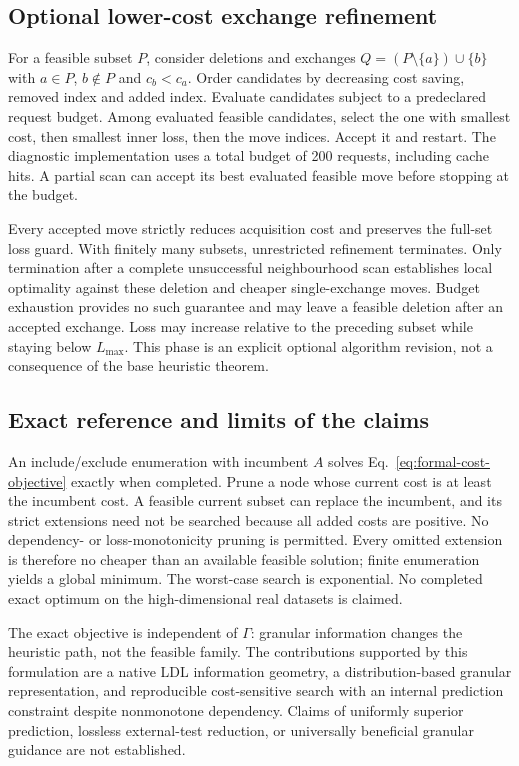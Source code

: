\subsection{Optional lower-cost exchange refinement}
For a feasible subset $P$, consider deletions and exchanges $Q=(P\setminus\{a\})\cup\{b\}$ with $a\in P$, $b\notin P$ and $c_b<c_a$. Order candidates by decreasing cost saving, removed index and added index. Evaluate candidates subject to a predeclared request budget. Among evaluated feasible candidates, select the one with smallest cost, then smallest inner loss, then the move indices. Accept it and restart. The diagnostic implementation uses a total budget of 200 requests, including cache hits. A partial scan can accept its best evaluated feasible move before stopping at the budget.

Every accepted move strictly reduces acquisition cost and preserves the full-set loss guard. With finitely many subsets, unrestricted refinement terminates. Only termination after a complete unsuccessful neighbourhood scan establishes local optimality against these deletion and cheaper single-exchange moves. Budget exhaustion provides no such guarantee and may leave a feasible deletion after an accepted exchange. Loss may increase relative to the preceding subset while staying below $L_{\max}$. This phase is an explicit optional algorithm revision, not a consequence of the base heuristic theorem.

\subsection{Exact reference and limits of the claims}
An include/exclude enumeration with incumbent $A$ solves Eq.~\eqref{eq:formal-cost-objective} exactly when completed. Prune a node whose current cost is at least the incumbent cost. A feasible current subset can replace the incumbent, and its strict extensions need not be searched because all added costs are positive. No dependency- or loss-monotonicity pruning is permitted. Every omitted extension is therefore no cheaper than an available feasible solution; finite enumeration yields a global minimum. The worst-case search is exponential. No completed exact optimum on the high-dimensional real datasets is claimed.

The exact objective is independent of $\Gamma$: granular information changes the heuristic path, not the feasible family. The contributions supported by this formulation are a native LDL information geometry, a distribution-based granular representation, and reproducible cost-sensitive search with an internal prediction constraint despite nonmonotone dependency. Claims of uniformly superior prediction, lossless external-test reduction, or universally beneficial granular guidance are not established.

